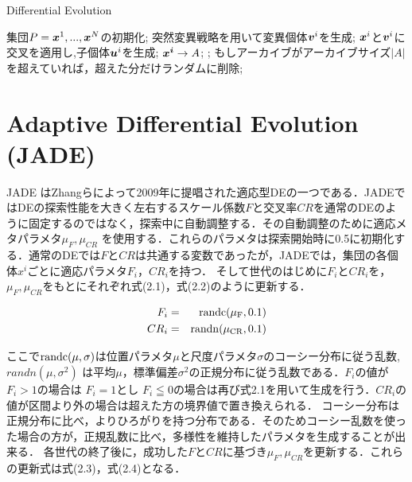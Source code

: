 \documentclass[a4paper,11pt,oneside,openany]{jsbook}
\def\vector#1{\mbox{\boldmath $#1$}}
\begin{document}
\newpage
\begin{algorithm}
\caption{Differential Evolution}
\label{alg:pbnf}
\begin{algorithmic}
\STATE 集団$P={\vector{x}^1,...,\vector{x}^N}$の初期化;
        \STATE 突然変異戦略を用いて変異個体{$\vector{v}^i$}を生成;
        \STATE $\vector{x}^i$と$\vector{v}^i$に交叉を適用し,子個体$\vector{u}^i$を生成;
    \ENDFOR
        \IF {$f(\vector{u}^i) \leqq f(\vector{x}^i)$}
            \STATE $\vector{x^i} \rightarrow {A}$;
            \STATE {$\vector{x}^i :=\vector{u}^i$};
        \ENDIF
    \ENDFOR
    \STATE もしアーカイブがアーカイブサイズ$|A|$を超えていれば，超えた分だけランダムに削除;
\ENDWHILE
\end{algorithmic}
\end{algorithm}
\newpage

\section{Adaptive Differential Evolution (JADE)}
JADE \cite{JADE} はZhangらによって2009年に提唱された適応型DEの一つである．JADEではDEの探索性能を大きく左右するスケール係数$F$と交叉率$CR$を通常のDEのように固定するのではなく，探索中に自動調整する．その自動調整のために適応メタパラメタ$\mu _F,\mu _{CR}$ を使用する．これらのパラメタは探索開始時に0.5に初期化する．通常のDEでは$F$と$CR$は共通する変数であったが，JADEでは，集団の各個体\vector{x^i}ごとに適応パラメタ$F_i$，$CR_i$を持つ．
そして世代のはじめに$F_i$と$CR_i$を，$\mu _F,\mu _{CR}$をもとにそれぞれ式(2.1)，式(2.2)のように更新する．

\begin{eqnarray}
  F_i & = & \rm{randc}(\mu _F, 0.1) \\
  CR_i & = & \rm{randn}(\mu _{CR}, 0.1)
\end{eqnarray}

ここで$\rm{randc}(\mu,\sigma)$は位置パラメタ$\mu$と尺度パラメタ$\sigma$のコーシー分布に従う乱数,$randn(\mu,\sigma^2)$ は平均$\mu$，標準偏差$\sigma^2$の正規分布に従う乱数である．$F_i$の値が$F_i>1$の場合は
$F_i=1$とし $F_i\leqq0$の場合は再び式2.1を用いて生成を行う．$CR_i$の値が区間より外の場合は超えた方の境界値で置き換えられる．
コーシー分布は正規分布に比べ，よりひろがりを持つ分布である．そのためコーシー乱数を使った場合の方が，正規乱数に比べ，多様性を維持したパラメタを生成することが出来る．
各世代の終了後に，成功した${F}$と${CR}$に基づき$\mu_F, \mu_{CR}$を更新する．これらの更新式は式(2.3)，式(2.4)となる．
\end{document}
